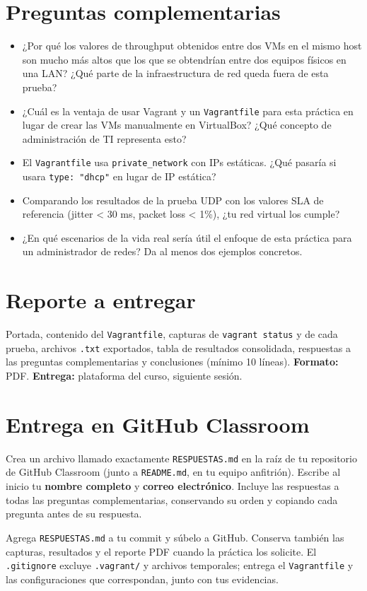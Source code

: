 \documentclass[12pt]{article}
\begin{document}
\section{Preguntas complementarias}

\begin{itemize}
	\item ¿Por qué los valores de throughput obtenidos entre dos VMs en el mismo host son mucho más altos que los que se obtendrían entre dos equipos físicos en una LAN? ¿Qué parte de la infraestructura de red queda fuera de esta prueba?
	\item ¿Cuál es la ventaja de usar Vagrant y un \texttt{Vagrantfile} para esta práctica en lugar de crear las VMs manualmente en VirtualBox? ¿Qué concepto de administración de TI representa esto?
	\item El \texttt{Vagrantfile} usa \texttt{private\_network} con IPs estáticas. ¿Qué pasaría si usara \texttt{type: "dhcp"} en lugar de IP estática?
	\item Comparando los resultados de la prueba UDP con los valores SLA de referencia (jitter < 30 ms, packet loss < 1\%), ¿tu red virtual los cumple?
	\item ¿En qué escenarios de la vida real sería útil el enfoque de esta práctica para un administrador de redes? Da al menos dos ejemplos concretos.
\end{itemize}

\section{Reporte a entregar}

Portada, contenido del \texttt{Vagrantfile}, capturas de \texttt{vagrant status} y de cada prueba, archivos \texttt{.txt} exportados, tabla de resultados consolidada, respuestas a las preguntas complementarias y conclusiones (mínimo 10 líneas). \textbf{Formato:} PDF. \textbf{Entrega:} plataforma del curso, siguiente sesión.


\section{Entrega en GitHub Classroom}

\begin{note}
Crea un archivo llamado exactamente \texttt{RESPUESTAS.md} en la raíz de tu repositorio de GitHub Classroom (junto a \texttt{README.md}, en tu equipo anfitrión). Escribe al inicio tu \textbf{nombre completo} y \textbf{correo electrónico}. Incluye las respuestas a todas las preguntas complementarias, conservando su orden y copiando cada pregunta antes de su respuesta.

Agrega \texttt{RESPUESTAS.md} a tu commit y súbelo a GitHub. Conserva también las capturas, resultados y el reporte PDF cuando la práctica los solicite. El \texttt{.gitignore} excluye \texttt{.vagrant/} y archivos temporales; entrega el \texttt{Vagrantfile} y las configuraciones que correspondan, junto con tus evidencias.
\end{note}
\end{document}
